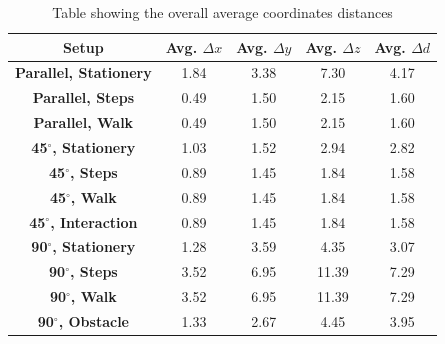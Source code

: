 \begin{table}[!h]
  \centering

  \begin{tabulary}{0.5\linewidth}{||c c c c c||} 
  \hline
  \textbf{Setup} & Avg. $\Delta x$ & Avg. $\Delta y$ & Avg. $\Delta z$ & Avg. $\Delta d$ \\ [0.5ex] 
  \hline\hline
  \textbf{Parallel, Stationery} & 1.84 & 3.38 & 7.30 & 4.17 \\
  \hline
  \textbf{Parallel, Steps} & 0.49 & 1.50 & 2.15 & 1.60 \\
  \hline
  \textbf{Parallel, Walk} & 0.49 & 1.50 & 2.15 & 1.60 \\
  \hline
  \textbf{45$^{\circ}$, Stationery} & 1.03 & 1.52 & 2.94 & 2.82 \\
  \hline
  \textbf{45$^{\circ}$, Steps} & 0.89 & 1.45 & 1.84 & 1.58 \\
  \hline
  \textbf{45$^{\circ}$, Walk} & 0.89 & 1.45 & 1.84 & 1.58 \\
  \hline
  \textbf{45$^{\circ}$, Interaction} & 0.89 & 1.45 & 1.84 & 1.58 \\
  \hline
  \textbf{90$^{\circ}$, Stationery} & 1.28 & 3.59 & 4.35 & 3.07 \\
  \hline
  \textbf{90$^{\circ}$, Steps} & 3.52 & 6.95 & 11.39 & 7.29 \\
  \hline
  \textbf{90$^{\circ}$, Walk} & 3.52 & 6.95 & 11.39 & 7.29 \\
  \hline
  \textbf{90$^{\circ}$, Obstacle} & 1.33 & 2.67 & 4.45 & 3.95 \\
  \hline
  \end{tabulary}
  
  \caption{Table showing the overall average coordinates distances}
  
  \label{table:overall_coordinates_values}
\end{table}


